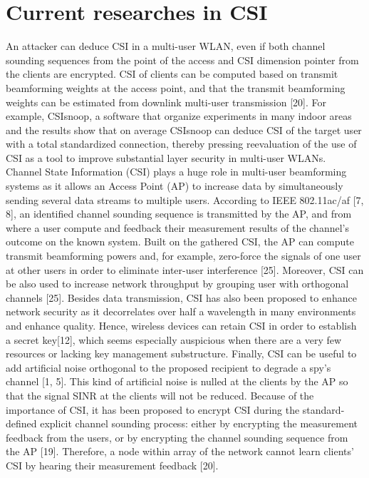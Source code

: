 \documentclass[conference]{IEEEtran}
\begin{document}
\section{Current researches in CSI}
An attacker can deduce CSI in a multi-user WLAN, even if both channel sounding sequences from the point of the access and CSI dimension pointer from the clients are encrypted. CSI of clients can be computed based on transmit beamforming weights at the access point, and that the transmit beamforming weights can be estimated from downlink multi-user transmission [20]. For example, CSIsnoop, a software that organize experiments in many indoor areas and the results show that on average CSIsnoop can deduce CSI of the target user with a total standardized connection, thereby pressing reevaluation of the use of CSI as a tool to improve substantial layer security in multi-user WLANs.
Channel State Information (CSI) plays a huge role in multi-user beamforming systems as it allows an Access Point (AP) to increase data by simultaneously sending several data streams to multiple users. \newline
According to IEEE 802.11ac/af [7, 8], an identified channel sounding sequence is transmitted by the AP, and from where a user compute and feedback their measurement results of the channel’s outcome on the known system. Built on the gathered CSI, the AP can compute transmit beamforming powers and, for example, zero-force the signals of one user at other users in order to eliminate inter-user interference [25]. Moreover, CSI can be also used to increase network throughput by grouping user with orthogonal channels [25]. Besides data transmission, CSI has also been proposed to enhance network security as it decorrelates over half a wavelength in many environments and enhance quality. 
\newline
Hence, wireless devices can retain CSI in order to establish a secret key[12], which seems especially auspicious when there are a very few resources or lacking key management substructure. Finally, CSI can be useful to add artificial noise orthogonal to the proposed recipient to degrade a spy's channel [1, 5]. This kind of artificial noise is nulled at the clients by the AP so that the signal SINR at the clients will not be reduced. Because of the importance of CSI, it has been proposed to encrypt CSI during the standard-defined explicit channel sounding process: either by encrypting the measurement feedback from the users, or by encrypting the channel sounding sequence from the AP [19]. Therefore, a node within array of the network cannot learn clients’ CSI by hearing their measurement feedback [20]. \newline
\end{document}
